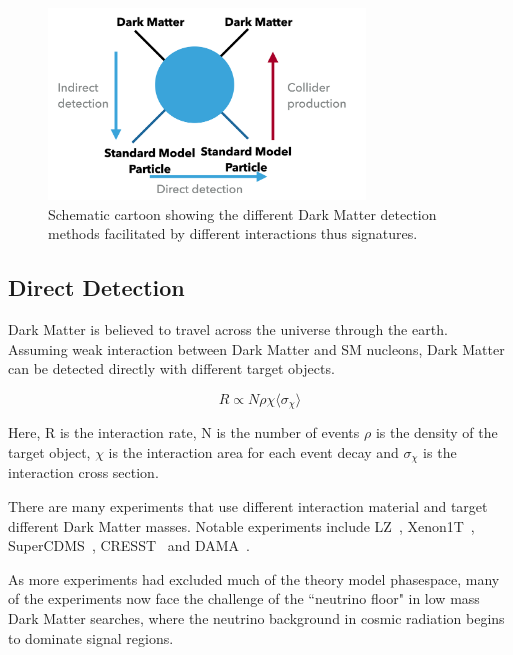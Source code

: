 \begin{figure}[!htb]
    \begin{center}
        \includegraphics[width=0.75\textwidth]{figures/chapter_DM/Interaction}
        \caption{
			Schematic cartoon showing the different Dark Matter detection methods facilitated by different interactions thus signatures. 
        }
        \label{fig:interaction}
    \end{center}
\end{figure}

\subsection{Direct Detection}
Dark Matter is believed to travel across the universe through the earth. Assuming weak interaction between Dark Matter and SM nucleons, Dark Matter can be detected directly with different target objects. 

\begin{equation}
    R \propto N \rho \chi \langle \sigma_{\chi } \rangle
\end{equation}

Here, R is the interaction rate, N is the number of events $\rho$ is the density of the target object, $\chi$ is the interaction area for each event decay and $\sigma_{\chi}$ is the interaction cross section. 

There are many experiments that use different interaction material and target different Dark Matter masses. Notable experiments include LZ~\cite{mckinsey2016lz}, Xenon1T~\cite{aprile2020excess}, SuperCDMS~\cite{Agnese_2016}, CRESST~\cite{Angloher_2014} and DAMA~\cite{Bernabei_2008}. 

As more experiments had excluded much of the theory model phasespace, many of the experiments now face the challenge of the ``neutrino floor" in low mass Dark Matter searches, where the neutrino background in cosmic radiation begins to dominate signal regions. 

